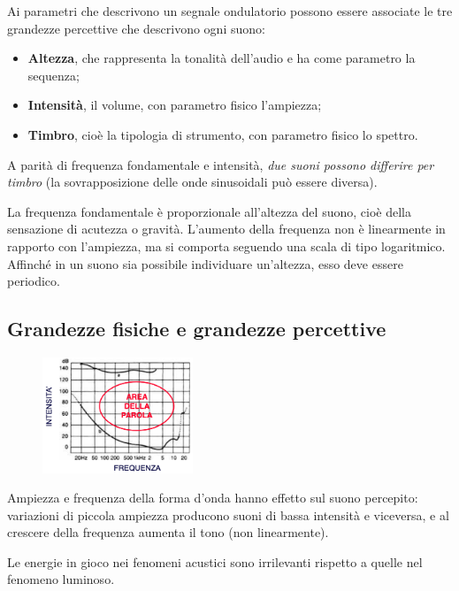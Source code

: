 Ai parametri che descrivono un segnale ondulatorio possono essere associate le tre grandezze percettive che descrivono ogni suono:
\begin{itemize}
	\item \textbf{Altezza}, che rappresenta la tonalità dell'audio e ha come parametro la sequenza;
	\item \textbf{Intensità}, il volume, con parametro fisico l'ampiezza;
	\item \textbf{Timbro}, cioè la tipologia di strumento, con parametro fisico lo spettro.
\end{itemize}

A parità di frequenza fondamentale e intensità, \textit{due suoni possono differire per timbro} (la sovrapposizione delle onde sinusoidali può essere diversa).

\newpage
La frequenza fondamentale è proporzionale all'altezza del suono, cioè della sensazione di acutezza o gravità. L'aumento della frequenza non è linearmente in rapporto con l'ampiezza, ma si comporta seguendo una scala di tipo logaritmico. Affinché in un suono sia possibile individuare un'altezza, esso deve essere periodico. 

\subsection{Grandezze fisiche e grandezze percettive}

 \begin{figure}
	\vspace{-15pt}
	\includegraphics[width=0.4\textwidth]{Lezioni/Immagini/parola}
	\vspace{-40pt}
\end{figure}

Ampiezza e frequenza della forma d'onda hanno effetto sul suono percepito: variazioni di piccola ampiezza producono suoni di bassa intensità e viceversa, e al crescere della frequenza aumenta il tono (non linearmente).

Le energie in gioco nei fenomeni acustici sono irrilevanti rispetto a quelle nel fenomeno luminoso. 

